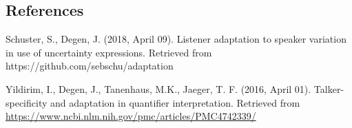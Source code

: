 \documentclass{sp}          %
\begin{document}
\subsection{References}

\begin{indent}Schuster, S., Degen, J. (2018, April 09). Listener adaptation to speaker variation in use of uncertainty expressions. Retrieved from https://github.com/sebschu/adaptation
\end{indent}

Yildirim, I., Degen, J., Tanenhaus, M.K., Jaeger, T. F. (2016, April 01). Talker-specificity and adaptation in quantifier interpretation. Retrieved from \url{https://www.ncbi.nlm.nih.gov/pmc/articles/PMC4742339/}

\printbibliography
%




\end{document}
